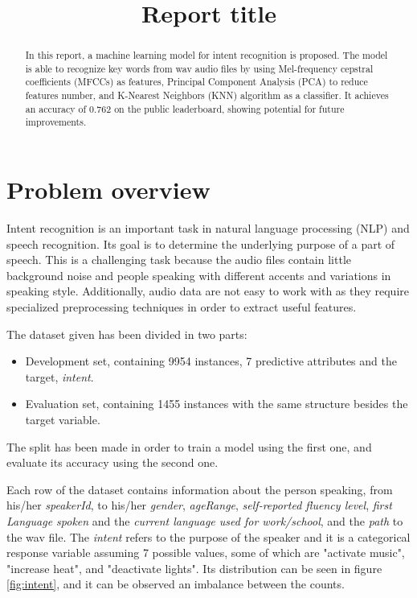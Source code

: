 \documentclass[conference]{IEEEtran}
\begin{document}
\title{Report title}

\author{
}

\maketitle

\begin{abstract}
    In this report, a machine learning model for intent recognition is proposed.
    The model is able to recognize key words from wav audio files by using Mel-frequency cepstral coefficients (MFCCs) as features, Principal Component Analysis (PCA) to reduce features number, and K-Nearest Neighbors (KNN) algorithm as a classifier.
    It achieves an accuracy of 0.762 on the public leaderboard, showing potential for future improvements.
\end{abstract}

\section{Problem overview}
Intent recognition is an important task in natural language processing (NLP) and speech recognition.
Its goal is to determine the underlying purpose of a part of speech.
This is a challenging task because the audio files contain little background noise and people speaking with different accents and variations in speaking style.
Additionally, audio data are not easy to work with as they require specialized preprocessing techniques in order to extract useful features.

The dataset given has been divided in two parts:
\begin{itemize}
    \item Development set, containing 9954 instances, 7 predictive attributes and the target, \textit{intent}.
    \item Evaluation set, containing 1455 instances with the same structure besides the target variable.
\end{itemize}
The split has been made in order to train a model using the first one, and evaluate its accuracy using the second one.

Each row of the dataset contains information about the person speaking, from his/her \textit{speakerId}, to his/her \textit{gender}, \textit{ageRange}, \textit{self-reported fluency level}, \textit{first Language spoken} and the \textit{current language used for work/school}, and the \textit{path} to the wav file.
The \textit{intent} refers to the purpose of the speaker and it is a categorical response variable assuming 7 possible values, some of which are "activate music", "increase heat", and "deactivate lights".
Its distribution can be seen in figure \ref{fig:intent}, and it can be observed an imbalance between the counts.
\end{document}
